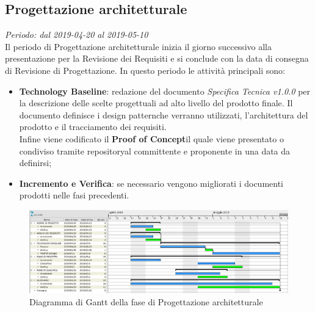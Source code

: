 \subsection{Progettazione architetturale}
\textit{Periodo: dal 2019-04-20 al 2019-05-10} \\
Il periodo di Progettazione architetturale inizia il giorno successivo alla presentazione per la Revisione dei Requisiti e si conclude con la data di consegna di Revisione di 
Progettazione. In questo periodo le attività principali sono:
\begin{itemize}
	\item \textbf{Technology Baseline\glo}: redazione del documento \textit{Specifica Tecnica v1.0.0} per la descrizione delle scelte progettuali ad alto livello del prodotto finale.
	Il documento definisce i design pattern\glosp che verranno utilizzati, l'architettura del prodotto e il tracciamento dei requisiti.\\
	Infine viene codificato il \textbf{Proof of Concept}\glosp il 
	quale viene presentato o condiviso tramite repository\glosp al committente e 
	proponente in una data da definirsi;
	\item \textbf{Incremento e Verifica}: se necessario vengono migliorati i 
	documenti prodotti nelle fasi precedenti.
\end{itemize}

\begin{figure}[H]
	\includegraphics[width=0.99\linewidth]{res/images/gantt_pa.png}
	\caption{Diagramma di Gantt della fase di Progettazione architetturale}
\end{figure}


